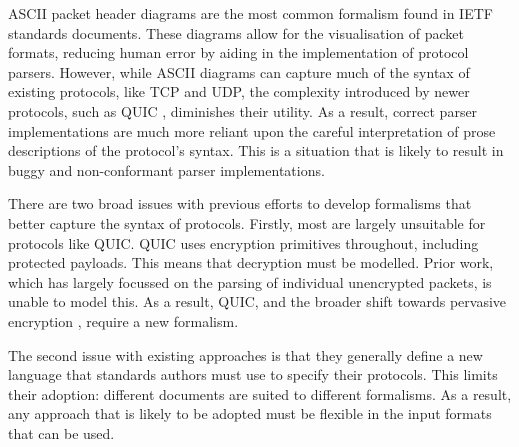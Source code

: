 \documentclass[10pt,sigconf]{acmart}
\begin{document}
ASCII packet header diagrams are the most common formalism found in IETF standards
documents. These diagrams allow for the visualisation of packet formats, reducing human error
by aiding in the implementation of protocol parsers. However, while ASCII diagrams can
capture much of the syntax of existing protocols, like TCP and UDP, the complexity
introduced by newer protocols, such as QUIC \cite{draft-ietf-quic-transport-latest},
diminishes their utility. As a result, correct parser implementations are much more
reliant upon the careful interpretation of prose descriptions of the protocol's syntax.
This is a situation that is likely to result in buggy and non-conformant parser implementations.


There are two broad issues with previous efforts to develop formalisms that better capture
the syntax of protocols. Firstly, most are largely unsuitable for protocols like QUIC.
QUIC uses encryption primitives throughout, including protected payloads. This means that
decryption must be modelled. Prior work, which has largely focussed on the parsing of
individual unencrypted packets, is unable to model this. As a result, QUIC, and the broader
shift towards pervasive encryption \cite{rfc7258}, require a new formalism.

The second issue with existing approaches is that they generally define a new language
that standards authors must use to specify their protocols. This limits their adoption:
different documents are suited to different formalisms. As a result,
any approach that is likely to be adopted must be flexible in the input formats that can
be used.

\end{document}
